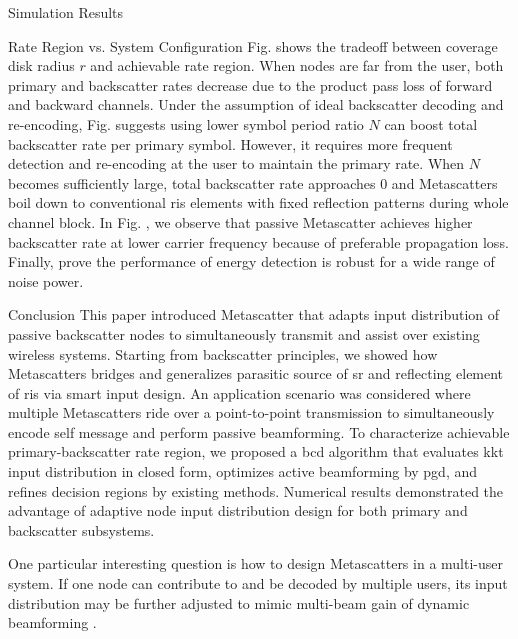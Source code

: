 \documentclass[journal]{IEEEtran}
\begin{document}
\begin{section}{Simulation Results}
\begin{subsection}{Rate Region vs. System Configuration}
		Fig.  shows the tradeoff between coverage disk radius $r$ and achievable rate region.
		When nodes are far from the user, both primary and backscatter rates decrease due to the product pass loss of forward and backward channels.
		Under the assumption of ideal backscatter decoding and re-encoding, Fig.  suggests using lower symbol period ratio $N$ can boost total backscatter rate per primary symbol.
		However, it requires more frequent detection and re-encoding at the user to maintain the primary rate.
		When $N$ becomes sufficiently large, total backscatter rate approaches \num{0} and Metascatters boil down to conventional \gls{ris} elements with fixed reflection patterns during whole channel block.
		In Fig. , we observe that passive Metascatter achieves higher backscatter rate at lower carrier frequency because of preferable propagation loss.
		Finally,  prove the performance of energy detection is robust for a wide range of noise power.
	\end{subsection}
\end{section}

\begin{section}{Conclusion}
	This paper introduced Metascatter that adapts input distribution of passive backscatter nodes to simultaneously transmit and assist over existing wireless systems.
	Starting from backscatter principles, we showed how Metascatters bridges and generalizes parasitic source of \gls{sr} and reflecting element of \gls{ris} via smart input design.
	An application scenario was considered where multiple Metascatters ride over a point-to-point transmission to simultaneously encode self message and perform passive beamforming.
	To characterize achievable primary-backscatter rate region, we proposed a \gls{bcd} algorithm that evaluates \gls{kkt} input distribution in closed form, optimizes active beamforming by \gls{pgd}, and refines decision regions by existing methods.
	Numerical results demonstrated the advantage of adaptive node input distribution design for both primary and backscatter subsystems.

	One particular interesting question is how to design Metascatters in a multi-user system.
	If one node can contribute to and be decoded by multiple users, its input distribution may be further adjusted to mimic multi-beam gain of dynamic beamforming \cite{Qiu2022}.
\end{section}
\end{document}
